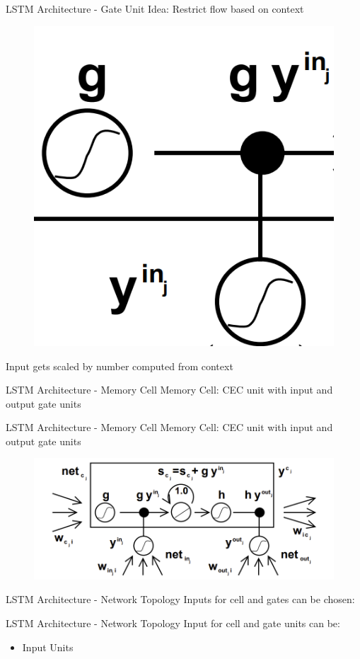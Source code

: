 \documentclass[10pt, aspectratio=169]{beamer}
\begin{document}
\begin{frame}[t]{LSTM Architecture - Gate Unit}
Idea: Restrict flow based on context
\begin{figure}
    \centering
    \includegraphics[width=0.2\linewidth]{images/GateUnit.png}
\end{figure}
Input gets scaled by number computed from context
\end{frame}


\begin{frame}[t]{LSTM Architecture - Memory Cell}
Memory Cell: CEC unit with input and output gate units
\end{frame}

\begin{frame}[t]{LSTM Architecture - Memory Cell}
Memory Cell: CEC unit with input and output gate units
\begin{figure}
    \centering
    \includegraphics[width=1\linewidth]{images/LSTM-Cell-Diagram.png}
\end{figure}
\end{frame}

\begin{frame}[t]{LSTM Architecture - Network Topology}
Inputs for cell and gates can be chosen:
\end{frame}

\begin{frame}[t]{LSTM Architecture - Network Topology}
Input for cell and gate units can be:
\begin{itemize}
    \item Input Units
\end{itemize}
\end{frame}
\end{document}
